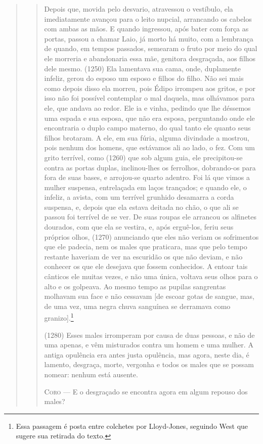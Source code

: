 \begin{verse}
\begin{verse}
Depois que, movida pelo desvario, atravessou o vestíbulo, ela
imediatamente avançou para o leito nupcial, arrancando os cabelos com
ambas as mãos. E quando ingressou, após bater com força as portas,
passou a chamar Laio, já morto há muito, com a lembrança de quando, em
tempos passados, semearam o fruto por meio do qual ele morreria e
abandonaria essa mãe, genitora desgraçada, aos filhos dele mesmo. (1250)
Ela lamentava sua cama, onde, duplamente infeliz, gerou do esposo um
esposo e filhos do filho. Não sei mais como depois disso ela morreu,
pois Édipo irrompeu aos gritos, e por isso não foi possível contemplar o
mal daquela, mas olhávamos para ele, que andava ao redor. Ele ia e
vinha, pedindo que lhe déssemos uma espada e sua esposa, que não era
esposa, perguntando onde ele encontraria o duplo campo materno, do qual
tanto ele quanto seus filhos brotaram. A ele, em sua fúria, alguma
divindade a mostrou, pois nenhum dos homens, que estávamos ali ao lado,
o fez. Com um grito terrível, como (1260) que sob algum guia, ele
precipitou-se contra as portas duplas, inclinou-lhes os ferrolhos,
dobrando-os para fora de suas bases, e arrojou-se quarto adentro. Foi lá
que vimos a mulher suspensa, entrelaçada em laços trançados; e quando
ele, o infeliz, a avista, com um terrível grunhido desamarra a corda
suspensa, e, depois que ela estava deitada no chão, o que ali se passou
foi terrível de se ver. De suas roupas ele arrancou os alfinetes
dourados, com que ela se vestira, e, após erguê-los, feriu seus próprios
olhos, (1270) anunciando que eles não veriam os sofrimentos que ele
padecia, nem os males que praticara, mas que pelo tempo restante
haveriam de ver na escuridão os que não deviam, e não conhecer os que
ele desejava que fossem conhecidos. A entoar tais cânticos ele muitas
vezes, e não uma única, voltava seus olhos para o alto e os golpeava. Ao
mesmo tempo as pupilas sangrentas molhavam sua face e não cessavam {[}de
escoar gotas de sangue, mas, de uma vez, uma negra chuva sanguínea se
derramava como granizo{]}.\footnote{Essa passagem é posta entre colchetes
  por Lloyd-Jones, seguindo West que sugere sua retirada do texto.}

(1280) Esses males irromperam por causa de duas pessoas, e não de uma
apenas, e vêm misturados contra um homem e uma mulher. A antiga
opulência era antes justa opulência, mas agora, neste dia, é lamento,
desgraça, morte, vergonha e todos os males que se possam nomear: nenhum
está ausente.

\textsc{Coro} --- E o desgraçado se encontra agora em algum repouso dos males?


\end{verse}
\end{verse}
